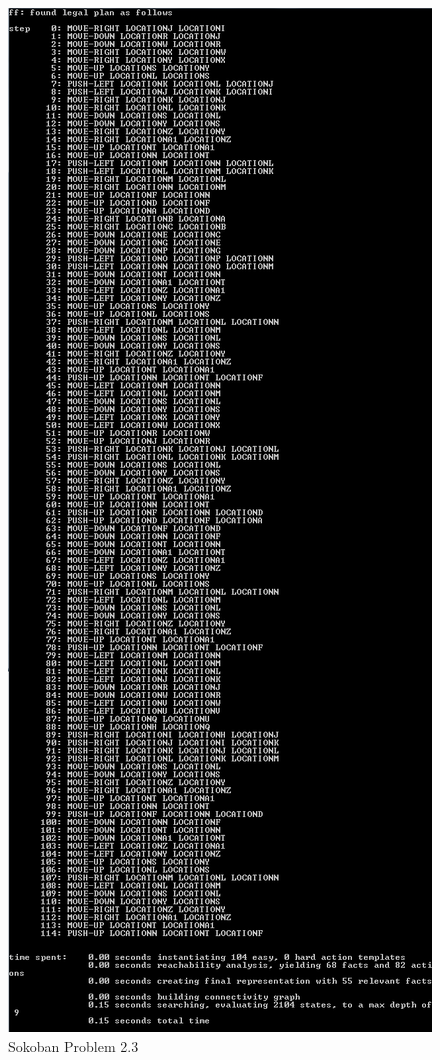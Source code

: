 \documentclass[10pt, letter]{article}
\begin{document}
\begin{figure}[h]
  \centering
    \includegraphics[scale = 0.5]{images/FF_Solution_p2_3}
    \caption{Sokoban Problem 2.3}
  \label{fig_prob2_3}
\end{figure}
\end{document}
